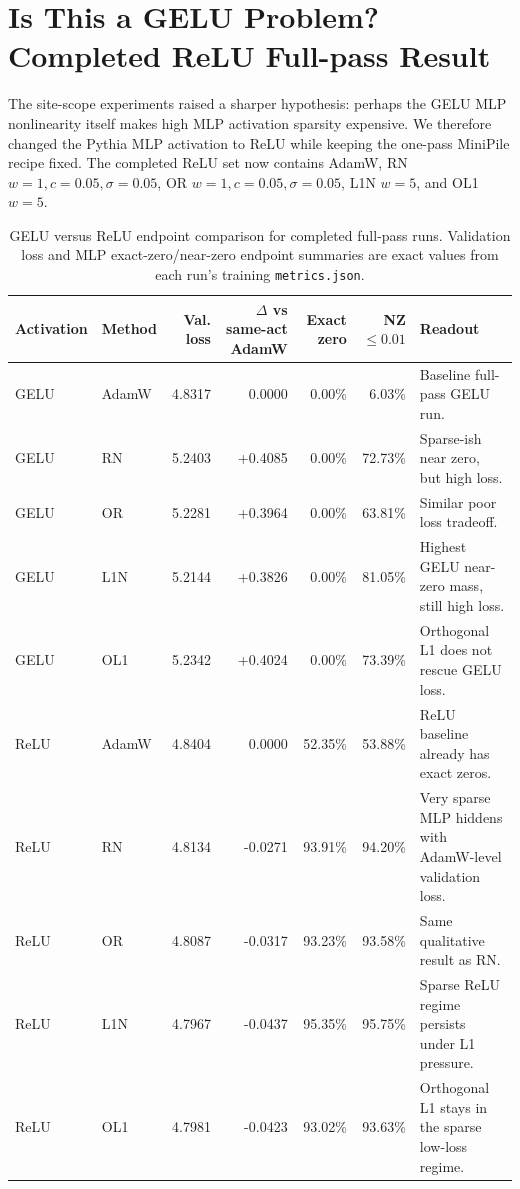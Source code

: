 \documentclass[10pt]{article}
\newcommand{\code}[1]{\texttt{#1}}
\newcommand{\pct}{\%}
\newcommand{\tightsection}[1]{\section{#1}\vspace{-0.35em}}
\begin{document}
\tightsection{Is This a GELU Problem? Completed ReLU Full-pass Result}

The site-scope experiments raised a sharper hypothesis: perhaps the GELU MLP nonlinearity itself makes high MLP activation sparsity expensive. We therefore changed the Pythia MLP activation to ReLU while keeping the one-pass MiniPile recipe fixed. The completed ReLU set now contains AdamW, RN \(w=1,c=0.05,\sigma=0.05\), OR \(w=1,c=0.05,\sigma=0.05\), L1N \(w=5\), and OL1 \(w=5\).

\begin{table}[H]
\centering
\caption{GELU versus ReLU endpoint comparison for completed full-pass runs. Validation loss and MLP exact-zero/near-zero endpoint summaries are exact values from each run's training \code{metrics.json}.}
\small
\begin{tabularx}{\textwidth}{llrrrrX}
\toprule
Activation & Method & Val. loss & \(\Delta\) vs same-act AdamW & Exact zero & NZ \(\le0.01\) & Readout \\
\midrule
GELU & AdamW & 4.8317 & 0.0000 & 0.00\pct & 6.03\pct & Baseline full-pass GELU run. \\
GELU & RN & 5.2403 & +0.4085 & 0.00\pct & 72.73\pct & Sparse-ish near zero, but high loss. \\
GELU & OR & 5.2281 & +0.3964 & 0.00\pct & 63.81\pct & Similar poor loss tradeoff. \\
GELU & L1N & 5.2144 & +0.3826 & 0.00\pct & 81.05\pct & Highest GELU near-zero mass, still high loss. \\
GELU & OL1 & 5.2342 & +0.4024 & 0.00\pct & 73.39\pct & Orthogonal L1 does not rescue GELU loss. \\
ReLU & AdamW & 4.8404 & 0.0000 & 52.35\pct & 53.88\pct & ReLU baseline already has exact zeros. \\
ReLU & RN & 4.8134 & -0.0271 & 93.91\pct & 94.20\pct & Very sparse MLP hiddens with AdamW-level validation loss. \\
ReLU & OR & 4.8087 & -0.0317 & 93.23\pct & 93.58\pct & Same qualitative result as RN. \\
ReLU & L1N & 4.7967 & -0.0437 & 95.35\pct & 95.75\pct & Sparse ReLU regime persists under L1 pressure. \\
ReLU & OL1 & 4.7981 & -0.0423 & 93.02\pct & 93.63\pct & Orthogonal L1 stays in the sparse low-loss regime. \\
\bottomrule
\end{tabularx}
\end{table}
\end{document}
